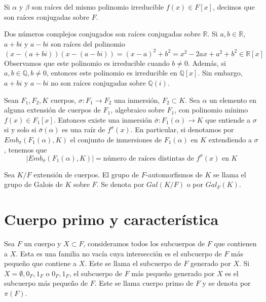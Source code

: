 \begin{definition}
    Si $\alpha$ y $\beta$ son raíces del mismo polinomio irreducible $f(x) \in F[x]$, decimos que son raíces conjugadas sobre $F$.
\end{definition}

\begin{remark}
    Dos números complejos conjugados son raíces conjugadas sobre $\mathbb{R}$. Si $a, b \in \mathbb{R}$, $a + bi$ y $a - bi$ son raíces del polinomio
    $$(x - (a+bi))(x - (a-bi)) = (x-a)^2 + b^2 = x^2 - 2ax + a^2 + b^2 \in \mathbb{R}[x]$$
    Observamos que este polinomio es irreducible cuando $b \neq 0$.
    Además, si $a, b \in \mathbb{Q}, b \neq 0$, entonces este polinomio es irreducible en $\mathbb{Q}[x]$.
    Sin embargo, $a + bi$ y $a - bi$ no son raíces conjugadas sobre $\mathbb{Q}(i)$.
\end{remark}

\begin{corollary}
    Sean $F_1, F_2, K$ cuerpos, $\sigma : F_1 \to F_2$ una inmersión, $F_2 \subset K$. Sea $\alpha$ un elemento en alguna extensión de cuerpos de $F_1$, algebraico sobre $F_1$, con polinomio mínimo $f(x) \in F_1[x]$. Entonces existe una inmersión $\bar{\sigma} : F_1(\alpha) \to K$ que entiende a $\sigma$ si y solo si $\bar{\sigma}(\alpha)$ es una raíz de $f^\sigma(x)$.
    En particular, si denotamos por $Emb_\sigma(F_1(\alpha), K)$ el conjunto de inmersiones de $F_1(\alpha)$ en $K$ extendiendo a $\sigma$, tenemos que
    $$|Emb_\sigma(F_1(\alpha), K)| = \text{número de raíces distintas de } f^\sigma(x) \text{ en } K$$
\end{corollary}

\begin{definition}
    Sea $K/F$ extensión de cuerpos.
    El grupo de $F$-automorfismos de $K$ se llama el grupo de Galois de $K$ sobre $F$.
    Se denota por $Gal(K/F)$ o por $Gal_F(K)$.
\end{definition}

\section{Cuerpo primo y característica}

\begin{definition}
    Sea $F$ un cuerpo y $X \subset F$, consideramos todos los subcuerpos de $F$ que contienen a $X$.
    Esta es una familia no vacía cuya intersección es el subcuerpo de $F$ más pequeño que contiene a $X$.
    Este se llama el subcuerpo de $F$ generado por $X$.
    Si $X = \emptyset, {0_F}, {1_F}$ o ${0_F, 1_F}$, el subcuerpo de $F$ más pequeño generado por $X$ es el subcuerpo más pequeño de $F$.
    Este se llama cuerpo primo de $F$ y se denota por $\pi(F)$.
\end{definition}

